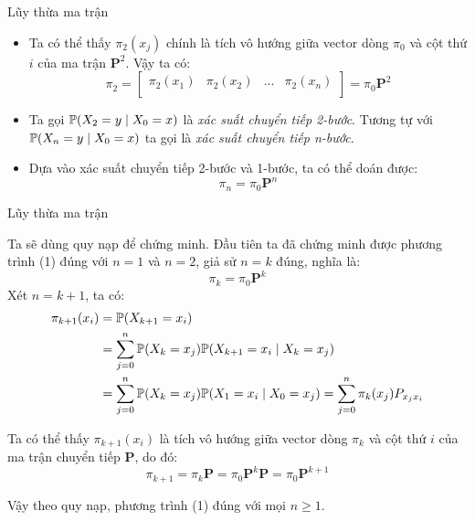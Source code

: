 \begin{frame}{Lũy thừa ma trận}
    \begin{itemize}
    \item[\bullet] Ta có thể thấy $\pi_2(x_j)$ chính là tích vô hướng giữa vector dòng $\pi_0$ và cột thứ $i$ của ma trận $\mathbf{P}^2$. Vậy ta có:
    $$
    \pi_2 = \begin{bmatrix}
        \pi_2(x_1) & \pi_2(x_2) & ... & \pi_2(x_n) \\
    \end{bmatrix} = \pi_0 \mathbf{P}^2
    $$

    \item[\bullet] Ta gọi $\P(X_2 = y \mid X_0 = x)$ là \textit{xác suất chuyển tiếp 2-bước}. Tương tự với $\P(X_n = y \mid X_0 = x)$ ta gọi là \textit{xác suất chuyển tiếp n-bước}.

    \item[\bullet] Dựa vào xác suất chuyển tiếp 2-bước và 1-bước, ta có thể doán được:
    \begin{equation}
    \pi_n = \pi_0 \mathbf{P}^{n}
    \end{equation}
    \end{itemize}
\end{frame}

\begin{frame}{Lũy thừa ma trận}
\begin{myproof*}{} Ta sẽ dùng quy nạp để chứng minh. Đầu tiên ta đã chứng minh được phương trình (1) đúng với $n = 1$ và $n = 2$, giả sử $n = k$ đúng, nghĩa là:
    $$
    \pi_k = \pi_0 \mathbf{P}^k
    $$
    \noindent Xét $n = k+1$, ta có:
    $$ 
    \begin{aligned}
    \pi_{k+1}(x_i) &= \P(X_{k+1} = x_i) \\
    &= \sum_{j=0}^{n} \P(X_{k} = x_j) \P(X_{k+1} = x_i \mid X_k = x_j) \\
    &= \sum_{j=0}^{n} \P(X_{k} = x_j) \P(X_1 = x_i \mid X_0 = x_j) = \sum_{j=0}^{n} \pi_{k}(x_j) P_{x_jx_i} \\
    \end{aligned}
    $$

    \noindent Ta có thể thấy $\pi_{k+1}(x_i)$ là tích vô hướng giữa vector dòng $\pi_k$ và cột thứ $i$ của ma trận chuyển tiếp $\mathbf{P}$, do đó:
    $$
    \pi_{k+1} = \pi_k \mathbf{P} = \pi_0 \mathbf{P}^{k} \mathbf{P} = \pi_0 \mathbf{P}^{k+1}
    $$

    \noindent Vậy theo quy nạp, phương trình (1) đúng với mọi $n \geq 1$.
\end{myproof*}
\end{frame}

